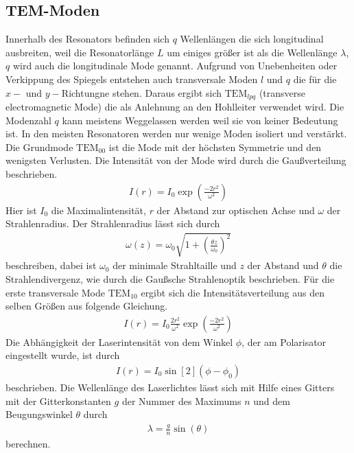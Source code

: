 \subsection{TEM-Moden}
Innerhalb des Resonators befinden sich $q$ Wellenlängen die sich longitudinal ausbreiten, weil die Resonatorlänge $L$ um einiges größer ist als die Wellenlänge $\lambda$, $q$ wird auch die longitudinale Mode genannt. Aufgrund von Unebenheiten oder Verkippung des Spiegels entstehen auch transversale Moden $l$ und $q$ die für die $x-$ und $y-$Richtungne stehen. Daraus ergibt sich $\mathrm{TEM}_{lpq}$ (transverse electromagnetic Mode) die als Anlehnung an den Hohlleiter verwendet wird. Die Modenzahl $q$ kann meistens Weggelassen werden weil sie von keiner Bedeutung ist. In den meisten Resonatoren werden nur wenige Moden isoliert und verstärkt.\\
Die Grundmode $\mathrm{TEM}_{00}$ ist die Mode mit der höchsten Symmetrie und den wenigsten Verlusten. Die Intensität von der Mode wird durch die Gaußverteilung beschrieben.
\begin{align}
I(r)=I_0\exp\left(\frac{-2r^2}{\omega^2}\right)
\label{eq:tem00}
\end{align}
Hier ist $I_0$ die Maximalintensität, $r$ der Abstand zur optischen Achse und $\omega$ der Strahlenradius. Der Strahlenradius lässt sich durch
\begin{align}
\omega(z)=\omega_0 \sqrt{1+\left(\frac{\theta z}{\omega_0}\right)^2}
\end{align}
beschreiben, dabei ist $\omega_0$ der minimale Strahltaille und $z$ der Abstand und $\theta$ die Strahlendivergenz, wie durch die Gaußsche Strahlenoptik beschrieben.
Für die erste transversale Mode $\mathrm{TEM}_{10}$ ergibt sich die Intensitätsverteilung aus den selben Größen aus folgende Gleichung.
\begin{align}
I(r)=I_0\frac{2r^2}{\omega^2}\exp\left(\frac{-2r^2}{\omega^2}\right)
\label{eq:tem10}
\end{align}
Die Abhängigkeit der Laserintensität von dem Winkel $\phi$, der am Polarisator eingestellt wurde, ist durch
\begin{align}
I(r)=I_0\sin[2](\phi - \phi_0)
\label{eq:polarisation}
\end{align}
beschrieben. %
Die Wellenlänge des Laserlichtes lässt sich mit Hilfe eines Gitters mit der Gitterkonstanten $g$ der Nummer des Maximums
$n$ und dem Beugungswinkel $\theta$ durch
\begin{align}
\lambda = \frac{g}{n} \sin(\theta)
\label{eq:gitter}
\end{align}
berechnen.


